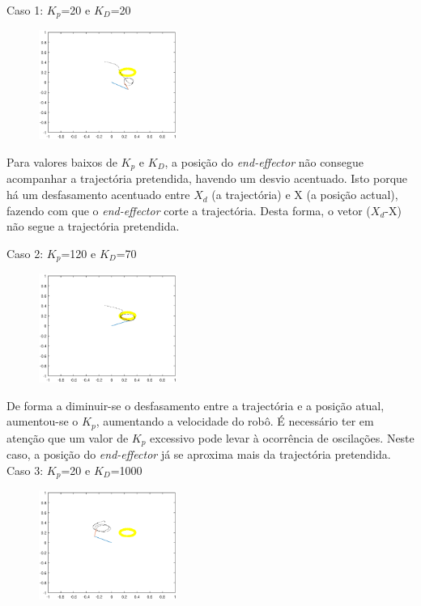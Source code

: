 \documentclass[a4paper,twocolumn,final,11pt]{article}
\begin{document}
Caso 1: $K_p$=20 e $K_D$=20  
\begin{figure}[H]
	\centering
	\includegraphics[width=0.4\textwidth]{7pd_ganhos_20_20.eps}
	\caption{}
  \label{}
\end{figure}

Para valores baixos de $K_p$ e $K_D$, a posição do \textit{end-effector} não consegue acompanhar a trajectória pretendida, havendo um desvio acentuado. Isto porque há um desfasamento acentuado entre $X_d$ (a trajectória) e X (a posição actual), fazendo com que o \textit{end-effector} corte a trajectória. Desta forma, o vetor ($X_d$-X) não segue a trajectória pretendida.
\linebreak


Caso 2:  $K_p$=120 e $K_D$=70

\begin{figure}[H]
	\centering
	\includegraphics[width=0.4\textwidth]{7pd_ganhos_120_70.eps}
	\caption{}
  \label{}
\end{figure}

De forma a diminuir-se o desfasamento entre a trajectória e a posição atual, aumentou-se o $K_p$, aumentando a velocidade do robô. É necessário ter em atenção que um valor de $K_p$ excessivo pode levar à ocorrência de oscilações.
Neste caso, a posição do \textit{end-effector} já se aproxima mais da trajectória pretendida.
\\

Caso 3: $K_p$=20 e $K_D$=1000

\begin{figure}[H]
	\centering
	\includegraphics[width=0.4\textwidth]{7pd_ganhos_20_1000.eps}
	\caption{}
  \label{}
\end{figure}
\end{document}

